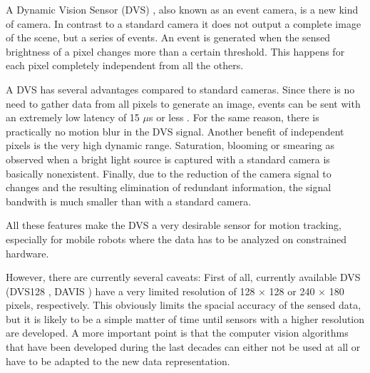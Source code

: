 A Dynamic Vision Sensor (DVS) \cite{lpd08dvs}, also known as an event camera, is a new kind of camera. In contrast to a standard camera it does not output a complete image of the scene, but a series of events. An event is generated when the sensed brightness of a pixel changes more than a certain threshold. This happens for each pixel completely independent from all the others.

A DVS has several advantages compared to standard cameras. Since there is no need to gather data from all pixels to generate an image, events can be sent with an extremely low latency of 15 $\mu$s or less \cite{lpd08dvs, brandli14davis}. For the same reason, there is practically no motion blur in the DVS signal. Another benefit of independent pixels is the very high dynamic range. Saturation, blooming or smearing as observed when a bright light source is captured with a standard camera is basically nonexistent. Finally, due to the reduction of the camera signal to changes and the resulting elimination of redundant information, the signal bandwith is much smaller than with a standard camera.

All these features make the DVS a very desirable sensor for motion tracking, especially for mobile robots where the data has to be analyzed on constrained hardware.

However, there are currently several caveats:
First of all, currently available DVS (DVS128 \cite{lpd08dvs}, DAVIS \cite{brandli14davis}) have a very limited resolution of 128 $\times$ 128 or 240 $\times$ 180 pixels, respectively. This obviously limits the spacial accuracy of the sensed data, but it is likely to be a simple matter of time until sensors with a higher resolution are developed. A more important point is that the computer vision algorithms that have been developed during the last decades can either not be used at all or have to be adapted to the new data representation.
